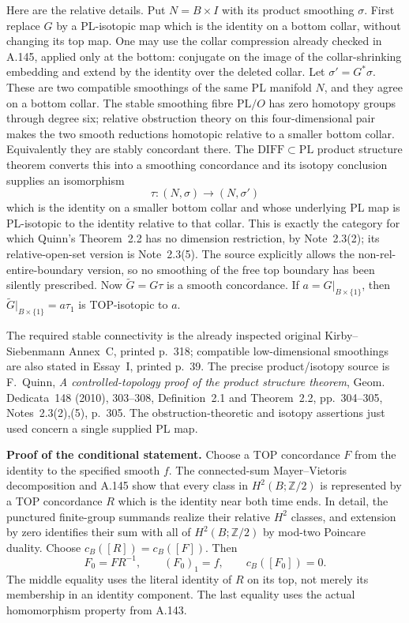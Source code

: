 Here are the relative details. Put $N=B\times I$ with its product
smoothing $\sigma$. First replace $G$ by a PL-isotopic map which is the
identity on a bottom collar, without changing its top map. One may use
the collar compression already checked in A.145, applied only at the
bottom: conjugate on the image of the collar-shrinking embedding and
extend by the identity over the deleted collar. Let
$\sigma'=G^*\sigma$. These are two compatible smoothings of the same
PL manifold $N$, and they agree on a bottom collar. The stable
smoothing fibre $\mathrm{PL}/O$ has zero homotopy groups through degree
six; relative obstruction theory on this four-dimensional pair makes
the two smooth reductions homotopic relative to a smaller bottom
collar. Equivalently they are stably concordant there. The
$\mathrm{DIFF}\subset\mathrm{PL}$ product structure theorem converts
this into a smoothing concordance and its isotopy conclusion supplies
an isomorphism
\[
 \tau:(N,\sigma)\longrightarrow(N,\sigma')
\]
which is the identity on a smaller bottom collar and whose underlying
PL map is PL-isotopic to the identity relative to that collar. This is
exactly the category for which Quinn's Theorem~2.2 has no dimension
restriction, by Note~2.3(2); its relative-open-set version is
Note~2.3(5). The source explicitly allows the non-rel-entire-boundary
version, so no smoothing of the free top boundary has been silently
prescribed. Now $\widetilde G=G\tau$ is a smooth concordance. If
$a=G|_{B\times\{1\}}$, then
$\widetilde G|_{B\times\{1\}}=a\tau_1$ is TOP-isotopic to $a$.

The required stable connectivity is the already inspected original
Kirby--Siebenmann Annex~C, printed p.~318; compatible low-dimensional
smoothings are also stated in Essay~I, printed p.~39. The precise
product/isotopy source is F.~Quinn, \emph{A controlled-topology proof of
the product structure theorem}, Geom. Dedicata~148 (2010), 303--308,
Definition~2.1 and Theorem~2.2, pp.~304--305, Notes~2.3(2),(5), p.~305.
The obstruction-theoretic and isotopy assertions just used concern a
single supplied PL map.

\textbf{Proof of the conditional statement.}\quad
Choose a TOP concordance $F$ from the identity to the specified smooth
$f$. The connected-sum Mayer--Vietoris decomposition and A.145 show
that every class in $H^2(B;\mathbb Z/2)$ is represented by a TOP
concordance $R$ which is the identity near both time ends. In detail,
the punctured finite-group summands realize their relative $H^2$
classes, and extension by zero identifies their sum with all of
$H^2(B;\mathbb Z/2)$ by mod-two Poincare duality. Choose
$c_B([R])=c_B([F])$. Then
\[
 F_0=FR^{-1},\qquad (F_0)_1=f,\qquad c_B([F_0])=0.
\]
The middle equality uses the literal identity of $R$ on its top,
not merely its membership in an identity component. The last equality
uses the actual homomorphism property from A.143.

